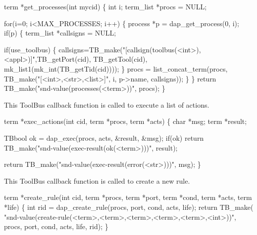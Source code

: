 \nwenddocs{}\endmoddef\let\nwnotused=\nwoutput{}
term *get_processes(int mycid)
\{
  int i;
  term_list *procs = NULL;

  for(i=0; i<MAX_PROCESSES; i++) \{
    process *p = dap_get_process(0, i);
    if(p) \{
      term_list *callsigns = NULL;

      if(use_toolbus) \{
        callsigns=TB_make("[callsign(toolbus(<int>),<appl>)]",TB_getPort(cid),
                 TB_getTool(cid), mk_list1(mk_int(TB_getTid(cid))));
      \}
      procs = list_concat_term(procs, TB_make("[<int>,<str>,<list>]", 
                                                i, p->name, callsigns));
    \}
  \}
  return TB_make("snd-value(processes(<term>))", procs);
\}
\nwendcode{}\nwdocspar


This ToolBus callback function is called to execute a list of actions. 

\nwenddocs{}\endmoddef\let\nwnotused=\nwoutput{}
term *exec_actions(int cid, term *procs, term *acts)
\{
  char *msg;
  term *result;

  TBbool ok = dap_exec(procs, acts, &result, &msg);
  if(ok)
    return TB_make("snd-value(exec-result(ok(<term>)))", result);

  return TB_make("snd-value(exec-result(error(<str>)))", msg);
\}
\nwendcode{}\nwdocspar


This ToolBus callback function is called to create a new rule. 

\nwenddocs{}\endmoddef\let\nwnotused=\nwoutput{}
term *create_rule(int cid, term *procs, term *port, term *cond, term *acts, term *life)
\{
  int rid = dap_create_rule(procs, port, cond, acts, life);
  return TB_make(
        "snd-value(create-rule(<term>,<term>,<term>,<term>,<term>,<int>))",
        procs, port, cond, acts, life, rid);
\}
\nwendcode{}\nwdocspar

